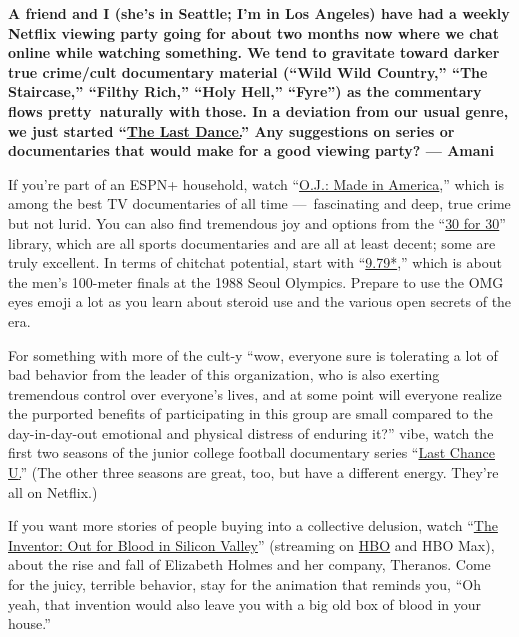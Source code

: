 \textbf{A friend and I (she's in Seattle; I'm in Los Angeles) have had a
weekly Netflix viewing party going for about two months now where we
chat online while watching something. We tend to gravitate toward darker
true crime/cult documentary material (``Wild Wild Country,'' ``The
Staircase,'' ``Filthy Rich,'' ``Holy Hell,'' ``Fyre'') as the commentary
flows pretty~naturally with those. In a deviation from our usual genre,
we just started ``\href{https://www.netflix.com/title/80203144}{The Last
Dance.}'' Any suggestions on series or documentaries that would make for
a good viewing party? --- Amani}

If you're part of an ESPN+ household, watch
``\href{http://www.espn.com/30for30/ojsimpsonmadeinamerica/}{O.J.: Made
in America},'' which is among the best TV documentaries of all time
---~fascinating and deep, true crime but not lurid. You can also find
tremendous joy and options from the
``\href{https://www.espn.com/espnplus/series/0514c1ad-efd1-4d3a-ad82-41ca579a94a2/30-for-30}{30
for 30}'' library, which are all sports documentaries and are all at
least decent; some are truly excellent. In terms of chitchat potential,
start with
``\href{http://www.espn.com/30for30/film/_/page/9.79}{9.79*},'' which is
about the men's 100-meter finals at the 1988 Seoul Olympics. Prepare to
use the OMG eyes emoji a lot as you learn about steroid use and the
various open secrets of the era.

For something with more of the cult-y ``wow, everyone sure is tolerating
a lot of bad behavior from the leader of this organization, who is also
exerting tremendous control over everyone's lives, and at some point
will everyone realize the purported benefits of participating in this
group are small compared to the day-in-day-out emotional and physical
distress of enduring it?'' vibe, watch the first two seasons of the
junior college football documentary series
``\href{https://www.netflix.com/title/80091742}{Last Chance
U}\href{https://www.nytimes.com/2020/07/28/arts/television/last-chance-u-season-5.html}{.}''
(The other three seasons are great, too, but have a different energy.
They're all on Netflix.)

If you want more stories of people buying into a collective delusion,
watch
``\href{https://www.nytimes.com/2019/03/18/arts/television/theranos-elizabeth-holmes.html}{The
Inventor: Out for Blood in Silicon Valley}'' (streaming on
\href{https://www.hbo.com/documentaries/the-inventor-out-for-blood-in-silicon-valley}{HBO}
and HBO Max), about the rise and fall of Elizabeth Holmes and her
company, Theranos. Come for the juicy, terrible behavior, stay for the
animation that reminds you, ``Oh yeah, that invention would also leave
you with a big old box of blood in your house.''

